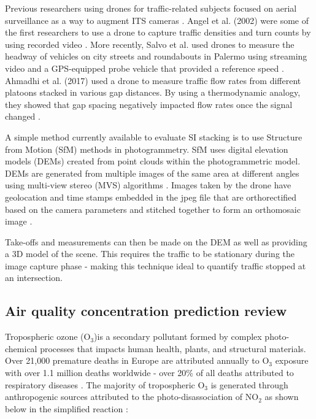 Previous researchers using drones for traffic-related subjects focused on aerial surveillance as a way to augment ITS cameras \citep{Liu2013, Barmpounakis2016}. Angel et al. (2002) were some of the first researchers to use a drone to capture traffic densities and turn counts by using recorded video \citep{Angel2002}. More recently, Salvo et al. used drones to measure the headway of vehicles on city streets and roundabouts in Palermo using streaming video and a GPS-equipped probe vehicle that provided a reference speed \citep{Salvo2014, Salvo2017}. Ahmadhi et al. (2017) used a drone to measure traffic flow rates from different platoons stacked in various gap distances. By using a thermodynamic analogy, they showed that gap spacing negatively impacted flow rates once the signal changed \citep{Ahmadi2017}.

A simple method currently available to evaluate SI stacking is to use Structure from Motion (SfM) methods in photogrammetry. SfM uses digital elevation models (DEMs) created from point clouds within the photogrammetric model. DEMs are generated from multiple images of the same area at different angles using multi-view stereo (MVS) algorithms \citep{James2017}. Images taken by the drone have geolocation and time stamps embedded in the jpeg file that are orthorectified based on the camera parameters and stitched together to form an orthomosaic image \citep{Westoby2012}.

Take-offs and measurements can then be made on the DEM as well as providing a 3D model of the scene. This requires the traffic to be stationary during the image capture phase - making this technique ideal to quantify traffic stopped at an intersection.


\clearpage
\subsection{Air quality concentration prediction review}

Tropospheric ozone (O$_{3}$)is a secondary pollutant formed by complex photo-chemical processes that impacts human health, plants, and structural materials. Over 21,000 premature deaths in Europe are attributed annually to O$_{3}$ exposure \citep{WHO2008} with over 1.1 million deaths worldwide - over 20\% of all deaths attributed to respiratory diseases \citep{Malley2017}. The majority of tropospheric O$_{3}$ is generated through anthropogenic sources \citep{Lelieveld2000, Cooper2006} attributed to the photo-disassociation of NO$_{2}$ as shown below in the simplified reaction \citep{Finlayson1993}:

